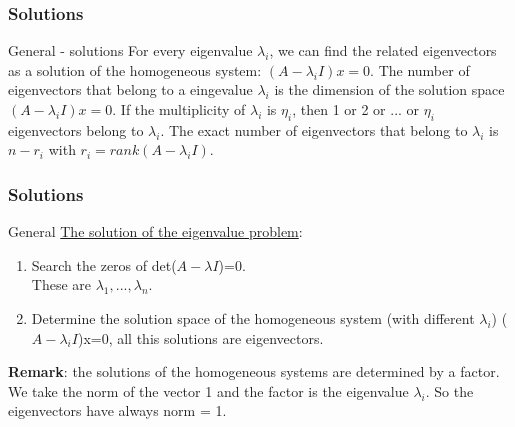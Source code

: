 \begin{frame}
	\frametitle{Solutions}
	\begin{block}{General - solutions}
		For every eigenvalue $\lambda_i$, we can find the related eigenvectors as a solution of the homogeneous system: $(A-\lambda_i I)x=0$. The number of eigenvectors that belong to a eingevalue $\lambda_i$ is the dimension of the solution space  $(A-\lambda_i I)x=0$.
		\vspace{4mm}
		If the multiplicity of $\lambda_i$ is $\eta_i$, then 1 or 2 or ... or $\eta_i$ eigenvectors belong to $\lambda_i$. The exact number of eigenvectors that belong to $\lambda_i$ is $n-r_i$ with $r_i=rank(A-\lambda_i I)$.
	\end{block}
\end{frame}

\begin{frame}
	\frametitle{Solutions}
	\begin{block}{General}
		\underline{The solution of the eigenvalue problem}:
		\begin{enumerate}
			\item Search the zeros of det($A-\lambda I$)=0. \\
			These are $\lambda_1,...,\lambda_n$.
			\item Determine the solution space of the homogeneous system (with different $\lambda_i$) ($A-\lambda_i I$)x=0, all this solutions are eigenvectors. 
		\end{enumerate}
		\textbf{Remark}: the solutions of the homogeneous systems are determined by a factor. We take the norm of the vector 1 and the factor is the eigenvalue $\lambda_i$. So the eigenvectors have always norm = 1.
	\end{block}
\end{frame}

